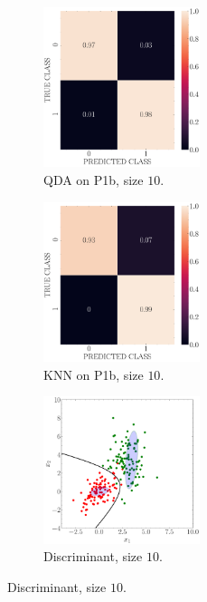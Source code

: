 \documentclass[11pt, a4 paper]{article}
\begin{document}
\begin{figure}[!htbp]
\centering
\quad
    \begin{subfigure}[!htbp]{0.24\textwidth}
       \centering
       \includegraphics[width=1.8in]{../results/ex1/conf_mtx_QD_ML_dataset_P1b_size_10.pdf}
       \caption{QDA on P1b, size $10$.}
       \label{fig:QDA_P1b_10}
    \end{subfigure}
\quad
    \begin{subfigure}[!htbp]{0.24\textwidth}
       \centering
       \includegraphics[width=1.8in]{../results/ex1/conf_mtx_KNN_dataset_P1b_size_10.pdf}
       \caption{KNN on P1b, size $10$.}
       \label{fig:KNN_P1b_10}
    \end{subfigure}
\quad
    \begin{subfigure}[!htbp]{0.24\textwidth}
       \centering
       \includegraphics[width=1.8in]{../results/ex1/samples_QD_ML_dataset_P1b_size_10.pdf}
       \caption{Discriminant, size $10$.}
       \label{fig:KNN_P1b_10}
    \end{subfigure}
    

\end{figure}
\end{document}
